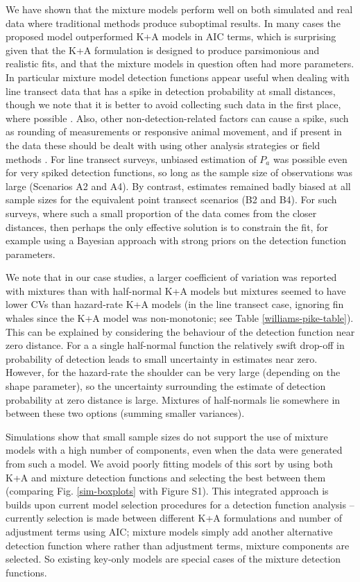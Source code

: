 \documentclass[10pt]{article}
\begin{document}
We have shown that the mixture models perform well on both simulated and real data where traditional methods produce suboptimal results. In many cases the proposed model outperformed K+A models in AIC terms, which is surprising given that the K+A formulation is designed to produce parsimonious and realistic fits, and that the mixture models in question often had more parameters. In particular mixture model detection functions appear useful when dealing with line transect data that has a spike in detection probability at small distances, though we note that it is better to avoid collecting such data in the first place, where possible \cite{Buckland:2001vm}.  Also, other non-detection-related factors can cause a spike, such as rounding of measurements or responsive animal movement, and if present in the data these should be dealt with using other analysis strategies or field methods \cite[see]{Buckland:2001vm}.  For line transect surveys, unbiased estimation of $P_a$ was possible even for very spiked detection functions, so long as the sample size of observations was large (Scenarios A2 and A4).  By contrast, estimates remained badly biased at all sample sizes for the equivalent point transect scenarios (B2 and B4). For such surveys, where such a small proportion of the data comes from the closer distances, then perhaps the only effective solution is to constrain the fit, for example using a Bayesian approach with strong priors on the detection function parameters.

We note that in our case studies, a larger coefficient of variation was reported with mixtures than with half-normal K+A models but mixtures seemed to have lower CVs than hazard-rate K+A models (in the line transect case, ignoring fin whales since the K+A model was non-monotonic; see Table \ref{williams-pike-table}). This can be explained by considering the behaviour of the detection function near zero distance. For a a single half-normal function the relatively swift drop-off in probability of detection leads to small uncertainty in estimates near zero. However, for the hazard-rate the shoulder can be very large (depending on the shape parameter), so the uncertainty surrounding the estimate of detection probability at zero distance is large. Mixtures of half-normals lie somewhere in between these two options (summing smaller variances). 

Simulations show that small sample sizes do not support the use of mixture models with a high number of components, even when the data were generated from such a model. We avoid poorly fitting models of this sort by using both K+A and mixture detection functions and selecting the best between them (comparing Fig. \ref{sim-boxplots} with Figure S1). This integrated approach is builds upon current model selection procedures for a detection function analysis -- currently selection is made between different K+A formulations and number of adjustment terms using AIC; mixture models simply add another alternative detection function where rather than adjustment terms, mixture components are selected. So existing key-only models are special cases of the mixture detection functions.
\end{document}
